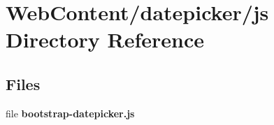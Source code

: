 \section{Web\-Content/datepicker/js Directory Reference}
\label{dir_6d1f57bb5be41e68aa2d36e6d23e5543}
\subsection*{Files}
\begin{DoxyCompactItemize}
\item 
file {\bf bootstrap-\/datepicker.\-js}
\end{DoxyCompactItemize}

